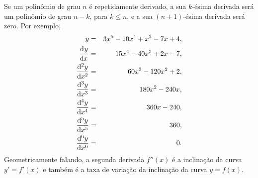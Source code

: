 \begin{example}
Se um polinômio de grau $n$ é repetidamente derivado, a sua $k$-ésima derivada
será um polinômio de grau $n - k$, para $k \le n$, e a sua $(n+1)$-ésima
derivada será zero. Por exemplo,
\begin{eqnarray*}
  y & = & 3x^5 - 10x^4 + x^2 - 7x + 4, \\
  \dod y x & = & 15x^4 - 40x^3 + 2x - 7, \\
  \dod[2] y x & = & 60x^3 - 120x^2 + 2, \\
  \dod[3] y x & = & 180x^2 - 240x, \\
  \dod[4] y x & = & 360x - 240, \\
  \dod[5] y x & = & 360, \\
  \dod[6] y x & = & 0. \\
\end{eqnarray*}
Geometricamente falando, a segunda derivada $f''(x)$ é a inclinação da curva
$y' = f'(x)$ e também é a taxa de variação da inclinação da curva $y = f(x)$.
\end{example}

